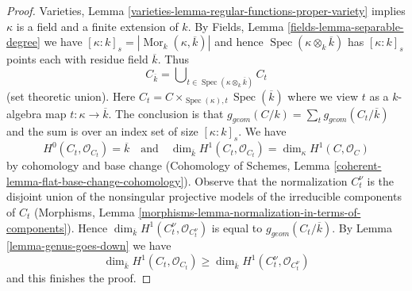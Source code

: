 \documentclass[10pt,a4paper]{amsart}
\theoremstyle{plain}
\theoremstyle{definition}
\theoremstyle{remark}
\numberwithin{equation}{subsection}
\def\Spec{\mathop{\mathrm{Spec}}}
\def\Mor{\mathop{\mathrm{Mor}}\nolimits}
\begin{document}
\begin{proof}
Varieties, Lemma \ref{varieties-lemma-regular-functions-proper-variety}
implies $\kappa$ is a field and a finite extension of $k$.
By Fields, Lemma \ref{fields-lemma-separable-degree}
we have $[\kappa : k]_s = |\Mor_k(\kappa, \overline{k})|$
and hence $\Spec(\kappa \otimes_k \overline{k})$ has
$[\kappa : k]_s$ points each with residue field $\overline{k}$.
Thus
$$
C_{\overline{k}} =
\bigcup\nolimits_{t \in \Spec(\kappa \otimes_k \overline{k})} C_t
$$
(set theoretic union). Here
$C_t = C \times_{\Spec(\kappa), t} \Spec(\overline{k})$ where
we view $t$ as a $k$-algebra map $t : \kappa \to \overline{k}$.
The conclusion is that $g_{geom}(C/k) = \sum_t g_{geom}(C_t/\overline{k})$
and the sum is over an index set of size $[\kappa : k]_s$.
We have
$$
H^0(C_t, \mathcal{O}_{C_t}) = \overline{k}
\quad\text{and}\quad
\dim_{\overline{k}} H^1(C_t, \mathcal{O}_{C_t}) =
\dim_\kappa H^1(C, \mathcal{O}_C)
$$
by cohomology and base change
(Cohomology of Schemes, Lemma \ref{coherent-lemma-flat-base-change-cohomology}).
Observe that the normalization $C_t^\nu$ is the disjoint
union of the nonsingular projective models of the
irreducible components of $C_t$
(Morphisms, Lemma \ref{morphisms-lemma-normalization-in-terms-of-components}).
Hence $\dim_{\overline{k}} H^1(C_t^\nu, \mathcal{O}_{C_t^\nu})$
is equal to $g_{geom}(C_t/\overline{k})$.
By Lemma \ref{lemma-genus-goes-down} we have
$$
\dim_{\overline{k}} H^1(C_t, \mathcal{O}_{C_t}) \geq
\dim_{\overline{k}} H^1(C_t^\nu, \mathcal{O}_{C_t^\nu})
$$
and this finishes the proof.
\end{proof}
\end{document}
